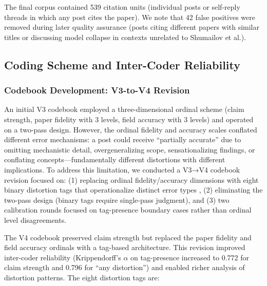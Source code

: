\documentclass[twocolumn,11pt]{article}
\begin{document}
The final corpus contained 539 citation units (individual posts or self-reply threads in which any post cites the paper). We note that 42 false positives were removed during later quality assurance (posts citing different papers with similar titles or discussing model collapse in contexts unrelated to Shumailov et al.).

\subsection{Coding Scheme and Inter-Coder Reliability}

\subsubsection{Codebook Development: V3-to-V4 Revision}

An initial V3 codebook employed a three-dimensional ordinal scheme (claim strength, paper fidelity with 3 levels, field accuracy with 3 levels) and operated on a two-pass design. However, the ordinal fidelity and accuracy scales conflated different error mechanisms: a post could receive ``partially accurate'' due to omitting mechanistic detail, overgeneralizing scope, sensationalizing findings, or conflating concepts—fundamentally different distortions with different implications. To address this limitation, we conducted a V3→V4 codebook revision focused on: (1) replacing ordinal fidelity/accuracy dimensions with eight binary distortion tags that operationalize distinct error types \cite{Wright2024,Sumner2014,Sarol2024,Greenberg2009}, (2) eliminating the two-pass design (binary tags require single-pass judgment), and (3) two calibration rounds focused on tag-presence boundary cases rather than ordinal level disagreements.

The V4 codebook preserved claim strength but replaced the paper fidelity and field accuracy ordinals with a tag-based architecture. This revision improved inter-coder reliability (Krippendorff's $\alpha$ on tag-presence increased to 0.772 for claim strength and 0.796 for ``any distortion'') and enabled richer analysis of distortion patterns. The eight distortion tags are:
\end{document}
